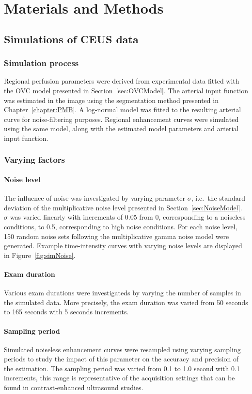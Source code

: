 \section{Materials and Methods}
\subsection{Simulations of CEUS data}
\subsubsection{Simulation process}
Regional perfusion parameters were derived from experimental data fitted with the OVC model presented in Section~\ref{sec:OVCModel}.
The arterial input function was estimated in the image using the segmentation method presented in Chapter~\ref{chapter:PMB}.
A log-normal model was fitted to the resulting arterial curve for noise-filtering purposes. 
Regional enhancement curves were simulated using the same model, along with the estimated model parameters and arterial input function.

\subsubsection{Varying factors}
\paragraph{Noise level}
The influence of noise was investigated by varying parameter $\sigma$, i.e.~the standard deviation of the multiplicative noise level presented in Section~\ref{sec:NoiseModel}.
$\sigma$ was varied linearly with increments of 0.05 from 0, corresponding to a noiseless conditions, to 0.5, corresponding to high noise conditions.
For each noise level, 150 random noise sets following the multiplicative gamma noise model were generated.
Example time-intensity curves with varying noise levels are displayed in Figure~\ref{fig:simNoise}.

\paragraph{Exam duration}
Various exam durations were investigateds by varying the number of samples in the simulated data.
More precisely, the exam duration was varied from 50 seconds to 165 seconds with 5 seconds increments.

\paragraph{Sampling period}
Simulated noiseless enhancement curves were resampled using varying sampling periods to study the impact of this parameter on the accuracy and precision of the estimation.
The sampling period was varied from 0.1 to 1.0 second with 0.1 increments, this range is representative of the acquisition settings that can be found in contrast-enhanced ultrasound studies.

